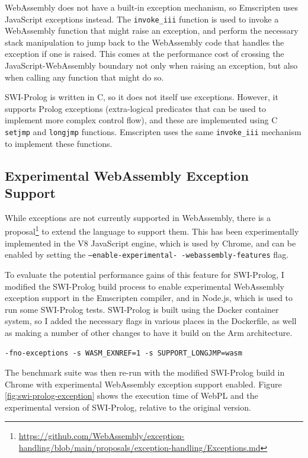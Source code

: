 WebAssembly does not have a built-in exception mechanism, so Emscripten uses JavaScript exceptions instead. The \texttt{invoke\_iii} function is used to invoke a WebAssembly function that might raise an exception, and perform the necessary stack manipulation to jump back to the WebAssembly code that handles the exception if one is raised. This comes at the performance cost of crossing the JavaScript-WebAssembly boundary not only when raising an exception, but also when calling any function that might do so.

SWI-Prolog is written in C, so it does not itself use exceptions. However, it supports Prolog exceptions (extra-logical predicates that can be used to implement more complex control flow), and these are implemented using C \texttt{setjmp} and \texttt{longjmp} functions. Emscripten uses the same \texttt{invoke\_iii} mechanism to implement these functions.

\subsection{Experimental WebAssembly Exception Support}

While exceptions are not currently supported in WebAssembly, there is a proposal\footnote{\url{https://github.com/WebAssembly/exception-handling/blob/main/proposals/exception-handling/Exceptions.md}} to extend the language to support them. This has been experimentally implemented in the V8 JavaScript engine, which is used by Chrome, and can be enabled by setting the \texttt{--enable-experimental- -webassembly-features} flag.

To evaluate the potential performance gains of this feature for SWI-Prolog, I modified the SWI-Prolog build process to enable experimental WebAssembly exception support in the Emscripten compiler, and in Node.js, which is used to run some SWI-Prolog tests. SWI-Prolog is built using the Docker container system, so I added the necessary flags in various places in the Dockerfile, as well as making a number of other changes to have it build on the Arm architecture.

\begin{verbatim}
-fno-exceptions -s WASM_EXNREF=1 -s SUPPORT_LONGJMP=wasm
\end{verbatim}

The benchmark suite was then re-run with the modified SWI-Prolog build in Chrome with experimental WebAssembly exception support enabled. Figure \ref{fig:swi-prolog-exception} shows the execution time of WebPL and the experimental version of SWI-Prolog, relative to the original version.

